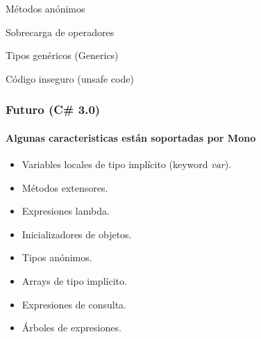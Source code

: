 \documentclass{beamer}
\begin{document}
\begin{frame}
  \begin{exampleblock}{Métodos anónimos}
    \begin{scriptsize}
      
    \end{scriptsize}
  \end{exampleblock}
\end{frame}

\begin{frame}
  \begin{exampleblock}{Sobrecarga de operadores}
    \begin{scriptsize}
      
    \end{scriptsize}
  \end{exampleblock}
\end{frame}

\begin{frame}
  \begin{exampleblock}{Tipos genéricos (Generics)}
    \begin{scriptsize}
      
    \end{scriptsize}
  \end{exampleblock}
\end{frame}

\begin{frame}
  \begin{exampleblock}{Código inseguro (unsafe code)}
    \begin{scriptsize}
      
    \end{scriptsize}
  \end{exampleblock}
\end{frame}

\begin{frame}
  \frametitle{Futuro (C\# 3.0)}
  \framesubtitle{Algunas caracteristicas están soportadas por Mono}

  \begin{itemize}
    \item Variables locales de tipo implícito (keyword \emph{var}).
    \item Métodos extensores.
    \item Expresiones lambda.
    \item Inicializadores de objetos.
    \item Tipos anónimos.
    \item Arrays de tipo implícito.
    \item Expresiones de consulta.
    \item Árboles de expresiones.
  \end{itemize}
\end{frame}
\end{document}
